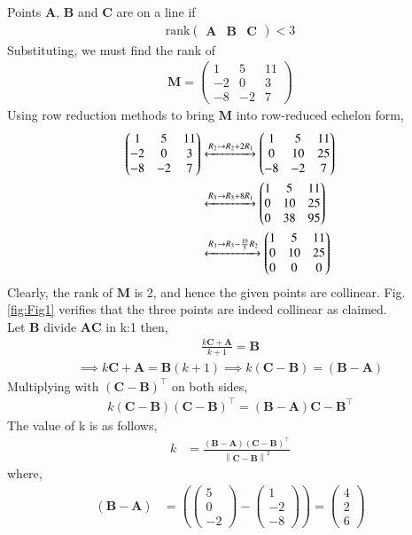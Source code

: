 \documentclass[12pt]{article}
\let\vec\mathbf
\providecommand{\brak}[1]{\ensuremath{\left(#1\right)}}
\providecommand{\norm}[1]{\left\lVert#1\right\rVert}
\newcommand{\myvec}[1]{\ensuremath{\begin{pmatrix}#1\end{pmatrix}}}
\let\vec\mathbf
\begin{document}
\begin{enumerate}
		Points $\vec{A}$, $\vec{B}$ and $\vec{C}$ are on a line if
    \begin{align}
        \textrm{rank}\myvec{\vec{A} & \vec{B} & \vec{C}} < 3
        \label{eq:chapters/12/10/5/8rank-collinear}
    \end{align}
    Substituting, we must find the rank of
    \begin{align}
        \vec{M} = \myvec{1&5&11\\-2&0&3\\-8&-2&7}
    \end{align}
    Using row reduction methods to bring $\vec{M}$ into row-reduced echelon form,
    \begin{align}
        \myvec{1&5&11\\-2&0&3\\-8&-2&7}&\xleftrightarrow[]{R_2\rightarrow R_2+2R_1}
        \myvec{1&5&11\\0&10&25\\-8&-2&7} \\
                &\xleftrightarrow[]{R_3\rightarrow R_3+8R_1}\myvec{1&5&11\\0&10&25\\0&38&95} \\
                &\xleftrightarrow[]{R_3\rightarrow R_3-\frac{19}{5}R_2}\myvec{1&5&11\\0&10&25\\0&0&0}
                \label{eq:chapters/12/10/5/8row-red}
    \end{align}
    Clearly, the rank of $\vec{M}$ is 2, and hence the given points are 
    collinear. 
    Fig. \ref{fig:Fig1}  verifies that the three points are indeed 
    collinear as claimed.\\
	Let $\vec{B}$ divide $\vec{AC}$ in k:1 then,
	\begin{align}
		\frac{k\vec{C}+\vec{A}}{k+1} = \vec{B}
	\end{align}
		\begin{align}
			\implies k\vec{C}+\vec{A}=\vec{B}\brak{k+1}
			\implies k\brak{\vec{C}-\vec{B}}=\brak{\vec{B}-\vec{A}}
		\end{align}
			Multiplying with $\brak{\vec{C}-\vec{B}}^{\top}$ on both sides,\\
	
		\begin{align*}
			 k\brak{\vec{C}-\vec{B}}\brak{\vec{C}-\vec{B}}^{\top}=\brak{\vec{B}-\vec{A}}{\vec{C}-\vec{B}}^{\top}
		\end{align*}
			The value of k is as follows,
			\begin{align}
			\label{eq:eq:8}
			k &=
			\frac{\brak{\vec{B}-\vec{A}}\brak{\vec{C}-\vec{B}}^{\top}}{\norm{\vec{C-B}}^2}
			\end{align}
			where,
			\begin{align}
				\brak{\vec{B-A}} &=
				\brak{\myvec{5\\0\\-2}-\myvec{1\\-2\\-8}} =
				\myvec{4\\2\\6}
			\end{align}
			

\end{enumerate}
\end{document}

